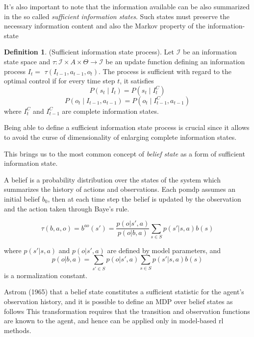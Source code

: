 \documentclass[a4paper,11pt]{report}
\theoremstyle{definition}
\newtheorem{definition}{Definition}[section]
\theoremstyle{plain}
\theoremstyle{remark}  %
\begin{document}
It's also important to note that the information available can be also summarized in the 
so called \textit{sufficient information states}. Such states must preserve
the necessary information content and also the Markov property of the information-state
\begin{definition}
    
    (Sufficient information state process). Let \(\mathcal{I}\) be an information state space 
    and \(\tau: \mathcal{I} \times A \times \Theta \rightarrow \mathcal{I}\) be an update function defining an information process \(I_{t}=\) 
    \(\tau\left(I_{t-1}, a_{t-1}, o_{t}\right)\). The process is sufficient with regard to the optimal control 
    if for every time step $t$, it satisfies
    $$P\left(s_{t} \mid I_{t}\right)=P\left(s_{t} \mid I_{t}^{C}\right)$$
    $$P\left(o_{t} \mid I_{t-1}, a_{t-1}\right)=P\left(o_{t} \mid I_{t-1}^{C}, a_{t-1}\right)$$
    where \(I_{t}^{C}\) and \(I_{t-1}^{C}\) are complete information states.

\end{definition} 

Being able to define a sufficient information state process is crucial since it allows to avoid 
the curse of dimensionality of enlarging complete information states.

This brings us to the most common concept of \textit{belief state} as a form of sufficient information state.

A belief is a probability distribution over the states of the system which summarizes the history of 
actions and observations. Each \gls{pomdp} assumes an initial belief $b_0$, then at each time step
the belief is updated by the observation and the action taken through Baye's rule.

$$\tau(b,a,o) = b^{ao}(s')=\displaystyle\frac{p(o|s',a)}{p(o|b,a)}\sum_{s\in S}p(s'|s,a)b(s)$$

where $p(s'|s,a)$ and $p(o|s',a)$ are defined by model parameters, and
$$p(o|b,a)=\displaystyle\sum_{s'\in S}p(o|s',a)\sum_{s\in S}p(s'|s,a)b(s)$$
is a normalization constant.

Astrom (1965) that a belief state constitutes a sufficient statistic for
the agent’s observation history, and it is possible to define an MDP over belief states as
follows
This transformation requires that the transition and observation functions are known
to the agent, and hence can be applied only in model-based \gls{rl} methods.
\end{document}
